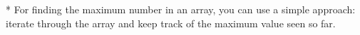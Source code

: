 \documentclass[preview]{standalone}
\begin{document}
* For finding the maximum number in an array, you can use a simple approach: iterate through the array and keep track of the maximum value seen so far.\\
\end{document}
